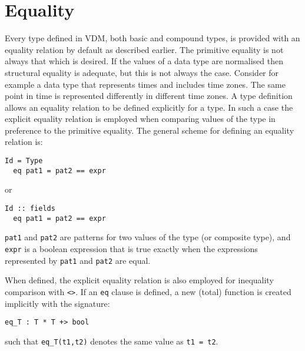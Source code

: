\documentclass{overturerepchap}
\begin{document}
\section{Equality}\label{eq}
Every type defined in VDM, both basic and compound types, is provided with an equality relation by default as described earlier.
The primitive equality is not always that which is desired.
If the values of a data type are normalised then structural equality is adequate, but this is not always the case.
Consider for example a data type that represents times and includes time zones.
The same point in time is represented differently in different time zones.
A type definition allows an equality relation to be defined explicitly for a type.
In such a case the explicit equality relation is employed when comparing values of the type in preference to the primitive equality.
The general scheme for defining an equality relation is:
\begin{lstlisting}
Id = Type
  eq pat1 = pat2 == expr
\end{lstlisting}
or
\begin{lstlisting}
Id :: fields
  eq pat1 = pat2 == expr
\end{lstlisting}
{\tt pat1} and {\tt pat2} are patterns for two values of the type (or composite type), and {\tt expr} is a boolean expression that is true exactly when the expressions represented by {\tt pat1} and {\tt pat2} are equal.

When defined, the explicit equality relation is also employed for inequality comparison with {\tt <>}.
If an {\tt eq} clause is defined, a new (total) function is created implicitly with the signature:
\begin{lstlisting}
eq_T : T * T +> bool
\end{lstlisting}
such that {\tt eq\_T(t1,t2)} denotes the same value as {\tt t1 = t2}.
\end{document}
